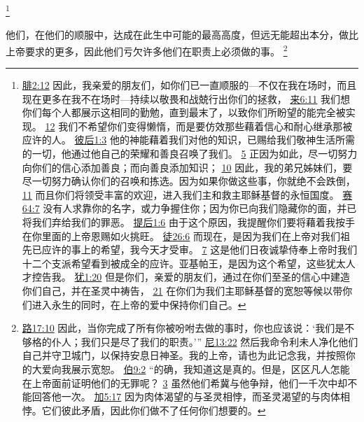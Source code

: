 \documentclass[12pt, a4paper, oneside]{ctexart}
\newcounter{parnum}[section]
\newcommand{\N}{%
   \noindent\refstepcounter{parnum}%
    \makebox[\parindent][l]{\textbf{\arabic{parnum}.}}}
\begin{document}
	\footnote {
		\href{https://biblehub.com/philippians/2-12.htm}{腓2:12} 因此，我亲爱的朋友们，如你们已一直顺服的---不仅在我在场时，而且现在更多在我不在场时---持续以敬畏和战兢行出你们的拯救，
		\href{https://biblehub.com/hebrews/6-11.htm}{来6:11} 我们想你们每个人都展示这相同的勤勉，直到最末了，以致你们所盼望的能完全被实现。
		\href{https://biblehub.com/hebrews/6-12.htm}{12} 我们不希望你们变得懒惰，而是要仿效那些藉着信心和耐心继承那被应许的人。
		\href{https://biblehub.com/2_peter/1-3.htm}{彼后1:3} 他的神能藉着我们对他的知识，已赐给我们敬神生活所需的一切，他通过他自己的荣耀和善良召唤了我们。
		\href{https://biblehub.com/2_peter/1-5.htm}{5} 正因为如此，尽一切努力向你们的信心添加善良；而向善良添加知识；
		\href{https://biblehub.com/2_peter/1-10.htm}{10} 因此，我的弟兄姊妹们，要尽一切努力确认你们的召唤和拣选。因为如果你做这些事，你就绝不会跌倒，
		\href{https://biblehub.com/2_peter/1-11.htm}{11} 而且你们将领受丰富的欢迎，进入我们主和救主耶稣基督的永恒国度。
		\href{https://biblehub.com/isaiah/64-7.htm}{赛64:7} 没有人求靠你的名字，或力争握住你；因为你已向我们隐藏你的面，并已将我们弃给我们的罪恶。
		\href{https://biblehub.com/2_timothy/1-6.htm}{提后1:6} 由于这个原因，我提醒你们要将藉着我按手在你里面的上帝恩赐如火挑旺。
		\href{https://biblehub.com/acts/26-6.htm}{徒26:6} 而现在，是因为我们在上帝对我们祖先已应许的事上的希望，我今天才受审。
		\href{https://biblehub.com/acts/26-7.htm}{7} 这是他们日夜诚挚侍奉上帝时我们十二个支派希望看到被成全的应许。亚基帕王，是因为这个希望，这些犹太人才控告我。
		\href{https://biblehub.com/jude/1-20.htm}{犹1:20} 但是你们，亲爱的朋友们，通过在你们至圣的信心中建造你们自己，并在圣灵中祷告，
		\href{https://biblehub.com/jude/1-21.htm}{21} 在你们为我们主耶稣基督的宽恕等候以带你们进入永生的同时，在上帝的爱中保持你们自己。
	}

\N 他们，在他们的顺服中，达成在此生中可能的最高高度，但远无能超出本分，做比上帝要求的更多，因此他们亏欠许多他们在职责上必须做的事。
	\footnote {
		\href{https://biblehub.com/luke/17-10.htm}{路17:10} 因此，当你完成了所有你被吩咐去做的事时，你也应该说：‘我们是不够格的仆人；我们只是尽了我们的职责。’”
		\href{https://biblehub.com/nehemiah/13-22.htm}{尼13:22} 然后我命令利未人净化他们自己并守卫城门，以保持安息日神圣。我的上帝，请也为此记念我，并按照你的大爱向我展示宽恕。
		\href{https://biblehub.com/job/9-2.htm}{伯9:2} “的确，我知道这是真的。但是，区区凡人怎能在上帝面前证明他们的无罪呢？
		\href{https://biblehub.com/job/9-3.htm}{3} 虽然他们希冀与他争辩，他们一千次中却不能回答他一次。
		\href{https://biblehub.com/galatians/5-17.htm}{加5:17} 因为肉体渴望的与圣灵相悖，而圣灵渴望的与肉体相悖。它们彼此矛盾，因此你们做不了任何你们想要的。 
	}
\end{document}
